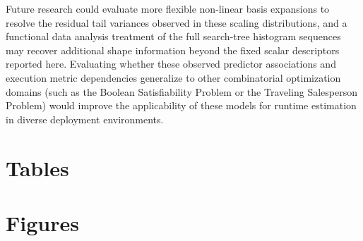 \documentclass[11pt,a4paper]{article}
\begin{document}
Future research could evaluate more flexible non-linear basis expansions to resolve the residual tail variances observed in these scaling distributions, and a functional data analysis treatment of the full search-tree histogram sequences may recover additional shape information beyond the fixed scalar descriptors reported here. Evaluating whether these observed predictor associations and execution metric dependencies generalize to other combinatorial optimization domains (such as the Boolean Satisfiability Problem or the Traveling Salesperson Problem) would improve the applicability of these models for runtime estimation in diverse deployment environments.


\section*{Tables}

\begin{table}[htbp]
\centering

\caption{Number of execution predictors appended for each algorithm in $M2$.}
\label{tab:predictor_counts}
\end{table}

\begin{table}[htbp]
\centering

\caption{Full-sample $R^2$ and adjusted $R^2$ for baseline ($M1$) and
         augmented ($M2$) OLS models across all outcome variables.}
\label{tab:ols_metrics}
\end{table}

\begin{table}[htbp]
\centering

\caption{Full-sample pseudo-$R^2$ for baseline ($M1$) and augmented ($M2$)
         Fractional Logit models for bounded proportional outcomes.}
\label{tab:flogit_metrics}
\end{table}

\begin{table}[htbp]
\centering

\caption{Top-10 standardised $\beta$ coefficients (by absolute magnitude) for
         the Branch and Bound \texttt{log\_nodes\_explored} $M2$ model.}
\label{tab:std_beta}
\end{table}

\section*{Figures}
\end{document}
